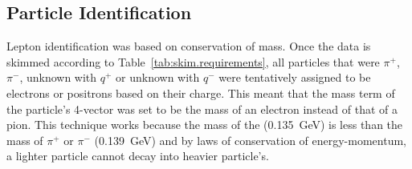 \subsection{Particle Identification}\label{sec:analysis.pid}

Lepton identification was based on conservation of mass. Once the data is skimmed according to Table~\ref{tab:skim.requirements}, all particles that were $\pi^+$, $\pi^-$, unknown with $q^+$ or unknown with $q^-$ were tentatively assigned to be electrons or positrons based on their charge. This meant that the mass term of the particle's 4-vector was set to be the mass of an electron instead of that of a pion. This technique works because the mass of the \piz (0.135~GeV) is less than the mass of $\pi^+$ or $\pi^-$ (0.139~GeV) and by laws of conservation of energy-momentum, a lighter particle cannot decay into heavier particle's.

